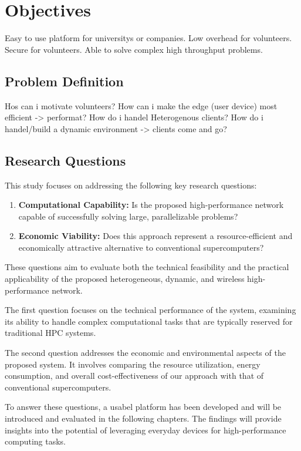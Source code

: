 \section{Objectives}
\label{sec:intro:objectives}
Easy to use platform for universitys or companies. Low overhead for volunteers. Secure for volunteers. Able to solve complex high throughput problems.
\subsection{Problem Definition}
\label{subsec:into:objectives:problems}
Hos can i motivate volunteers? How can i make the edge (user device) most efficient -> performat? How do i handel Heterogenous clients? How do i handel/build a dynamic environment -> clients come and go?
\subsection{Research Questions}
\label{subsec:into:objectives:questions}
This study focuses on addressing the following key research questions:

\begin{enumerate}
    \item \textbf{Computational Capability:} Is the proposed high-performance network capable of successfully solving large, parallelizable problems?
    
    \item \textbf{Economic Viability:} Does this approach represent a resource-efficient and economically attractive alternative to conventional supercomputers?
\end{enumerate}

These questions aim to evaluate both the technical feasibility and the practical applicability of the proposed heterogeneous, dynamic, and wireless high-performance network.

The first question focuses on the technical performance of the system, examining its ability to handle complex computational tasks that are typically reserved for traditional \ac{HPC} systems.

The second question addresses the economic and environmental aspects of the proposed system. It involves comparing the resource utilization, energy consumption, and overall cost-effectiveness of our approach with that of conventional supercomputers.

To answer these questions, a usabel platform has been developed and will be introduced and evaluated in the following chapters. The findings will provide insights into the potential of leveraging everyday devices for high-performance computing tasks.

